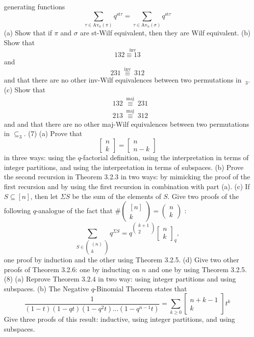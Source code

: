 \documentclass[a4paper,12pt]{ctexbook}
\begin{document}
generating functions
$$
\sum_{\tau \in \mathrm{Av}_{n}(\pi)} q^{\mathrm{st} \tau}=\sum_{\tau \in \mathrm{Av}_{n}(\sigma)} q^{\mathrm{st} \tau}
$$
(a) Show that if $\pi$ and $\sigma$ are st-Wilf equivalent, then they are Wilf equivalent.
(b) Show that
$$
132 \stackrel{\text { inv }}{\equiv 13}
$$
and
$$
231 \stackrel{\text { inv }}{\equiv} 312
$$
and that there are no other inv-Wilf equivalences between two permutations in $\mathfrak{~}_{3}$.
(c) Show that
$$
\begin{aligned}
&132 \stackrel{\text { maj }}{\equiv} 231 \\
&213 \stackrel{\text { maj }}{\equiv} 312
\end{aligned}
$$
and
and that there are no other maj-Wilf equivalences between two permutations in $\subseteq_{3}$.
(7) (a) Prove that
$$
\left[\begin{array}{l}
n \\
k
\end{array}\right]=\left[\begin{array}{c}
n \\
n-k
\end{array}\right]
$$
in three ways: using the $q$-factorial definition, using the interpretation in terms of integer partitions, and using the interpretation in terms of subspaces.
(b) Prove the second recursion in Theorem 3.2.3 in two ways: by mimicking the proof of the first recursion and by using the first recursion in combination with part (a).
(c) If $S \subseteq[n]$, then let $\Sigma S$ be the sum of the elements of $S$. Give two proofs of the following $q$-analogue of the fact that $\#\left(\begin{array}{c}{[n]} \\ k\end{array}\right)=\left(\begin{array}{c}n \\ k\end{array}\right)$ :
$$
\sum_{S \in\left(\begin{array}{c}
	(n) \\
	k
	\end{array}\right)} q^{\Sigma S}=q^{\left(\begin{array}{c}
	k+1 \\
	2
	\end{array}\right)}\left[\begin{array}{l}
n \\
k
\end{array}\right]_{q},
$$
one proof by induction and the other using Theorem 3.2.5.
(d) Give two other proofs of Theorem 3.2.6: one by inducting on $n$ and one by using Theorem 3.2.5.
(8) (a) Reprove Theorem $3.2 .4$ in two way: using integer partitions and using subspaces.
(b) The Negative $q$-Binomial Theorem states that
$$
\frac{1}{(1-t)(1-q t)\left(1-q^{2} t\right) \ldots\left(1-q^{n-1} t\right)}=\sum_{k \geq 0}\left[\begin{array}{c}
n+k-1 \\
k
\end{array}\right] t^{k}
$$
Give three proofs of this result: inductive, using integer partitions, and using subspaces.
\end{document}
